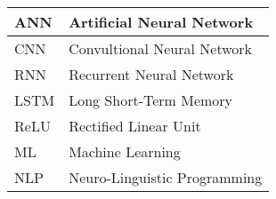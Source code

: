 



\begin{longtable}{p{90pt}l}
\hline ANN    	&\vline  Artificial Neural Network \\
\hline CNN      &\vline  Convultional Neural Network \\
\hline RNN      &\vline  Recurrent Neural Network\\
\hline LSTM     &\vline  Long Short-Term Memory\\
\hline ReLU     &\vline  Rectified Linear Unit \\
\hline ML       &\vline  Machine Learning \\
\hline NLP      &\vline  Neuro-Linguistic Programming\\

\hline 

\end{longtable}

